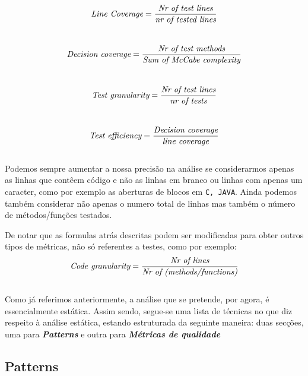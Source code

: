 \[ \emph{\text{Line Coverage}} = \frac{\emph{\text{Nr of test lines}}}{\emph{\text{nr of tested lines}}} \] \\

\[ \emph{\text{Decision coverage}} = \frac{\emph{\text{Nr of test methods}}}{\emph{\text{Sum of McCabe complexity}}} \] \\

\[ \emph{\text{Test granularity}} = \frac{\emph{\text{Nr of test lines}}}{\emph{\text{nr of tests}}} \] \\

\[\emph{\text{Test efficiency}} = \frac{\emph{\text{Decision coverage}}}{\emph{\text{line coverage}}} \] \\


Podemos sempre aumentar a nossa precisão na análise se considerarmos apenas as linhas que contêem código e não as linhas em branco ou linhas com apenas um caracter, 
como por exemplo as aberturas de blocos em \texttt{C, JAVA}.
Ainda podemos também considerar não apenas o numero total de linhas mas também o número de métodos/funções testados.

De notar que as formulas atrás descritas podem ser modificadas para obter outros tipos de métricas, não só referentes a testes, como por exemplo:\\

\[\emph{\text{Code granularity}} = \frac{\emph{\text{Nr of lines}}}{\emph{\text{Nr of (methods/functions)}}} \] \\

Como já referimos anteriormente, a análise que se pretende, por agora, é essencialmente estática. Assim sendo, segue-se uma lista de técnicas no que diz respeito à análise
 estática, estando estruturada da seguinte maneira: duas secções, uma para \emph{\textbf{Patterns}} e outra para \emph{\textbf{Métricas de qualidade}}

\subsection{Patterns}
